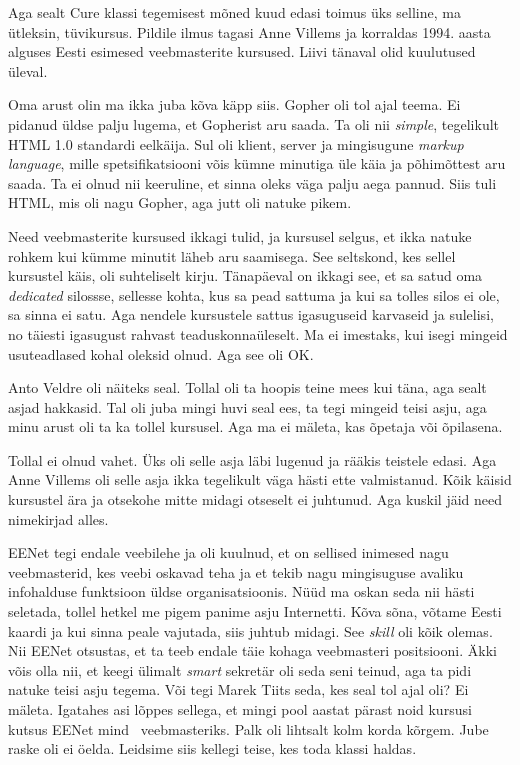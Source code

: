 Aga sealt Cure klassi tegemisest mõned kuud edasi toimus üks selline, ma 
ütleksin, tüvikursus. Pildile ilmus tagasi Anne Villems ja korraldas 1994. aasta alguses Eesti esimesed veebmasterite kursused. 
Liivi tänaval olid kuulutused üleval.

Oma arust olin ma ikka juba kõva käpp siis. 
Gopher oli tol ajal teema. Ei pidanud üldse palju lugema, et 
Gopherist aru saada. Ta oli nii \emph{simple},  tegelikult  HTML 1.0 standardi 
eelkäija. Sul oli klient, server ja mingisugune \emph{markup language}, mille 
spetsifikatsiooni võis kümne minutiga üle käia ja põhimõttest aru saada. Ta ei 
olnud nii keeruline, et sinna  oleks väga palju aega pannud. Siis tuli HTML, 
mis oli nagu Gopher, aga jutt oli natuke pikem. 

Need veebmasterite kursused ikkagi tulid, ja kursusel selgus, et ikka natuke 
rohkem kui kümme minutit läheb aru saamisega. See seltskond, kes sellel kursustel käis, oli 
suhteliselt kirju. Tänapäeval on ikkagi see, et sa satud oma \emph{dedicated} 
silossse, sellesse kohta, kus sa pead sattuma ja kui sa tolles silos ei ole, sa 
sinna ei satu. Aga nendele kursustele sattus igasuguseid karvaseid ja sulelisi, 
no täiesti igasugust rahvast teaduskonnaüleselt. Ma ei imestaks, kui isegi 
mingeid usuteadlased kohal oleksid olnud. Aga see oli OK.

Anto Veldre oli näiteks seal. Tollal oli ta hoopis 
teine mees kui täna, aga sealt asjad hakkasid. Tal oli juba mingi huvi seal 
ees, ta tegi mingeid teisi asju, aga minu arust oli ta ka tollel kursusel. Aga 
ma ei mäleta, kas õpetaja või õpilasena.


Tollal ei olnud vahet. Üks oli selle asja läbi lugenud ja rääkis teistele 
edasi. Aga Anne Villems oli selle asja ikka 
tegelikult väga hästi ette valmistanud. Kõik käisid kursustel ära ja otsekohe mitte 
midagi otseselt ei juhtunud. Aga kuskil jäid need nimekirjad alles. 

EENet tegi endale veebilehe ja oli kuulnud, et on sellised 
inimesed nagu veebmasterid, kes veebi oskavad teha ja et tekib nagu mingisuguse 
avaliku infohalduse funktsioon üldse organisatsioonis. Nüüd ma oskan seda nii 
hästi seletada, tollel hetkel me pigem panime asju Internetti. Kõva sõna, 
võtame Eesti kaardi ja kui sinna peale vajutada, siis juhtub midagi. See 
\emph{skill} oli kõik olemas. Nii EENet otsustas, et ta teeb  endale täie 
kohaga veebmasteri positsiooni. Äkki võis olla nii, et keegi ülimalt \emph{smart} 
sekretär oli seda seni teinud, aga ta pidi natuke teisi asju tegema. Või tegi Marek 
Tiits seda, kes seal tol ajal oli? Ei mäleta. Igatahes 
asi lõppes sellega, et mingi pool aastat pärast noid kursusi  kutsus EENet mind 
veebmasteriks. Palk oli lihtsalt kolm korda kõrgem. Jube raske oli ei öelda. 
Leidsime siis kellegi teise, kes toda klassi haldas. 

